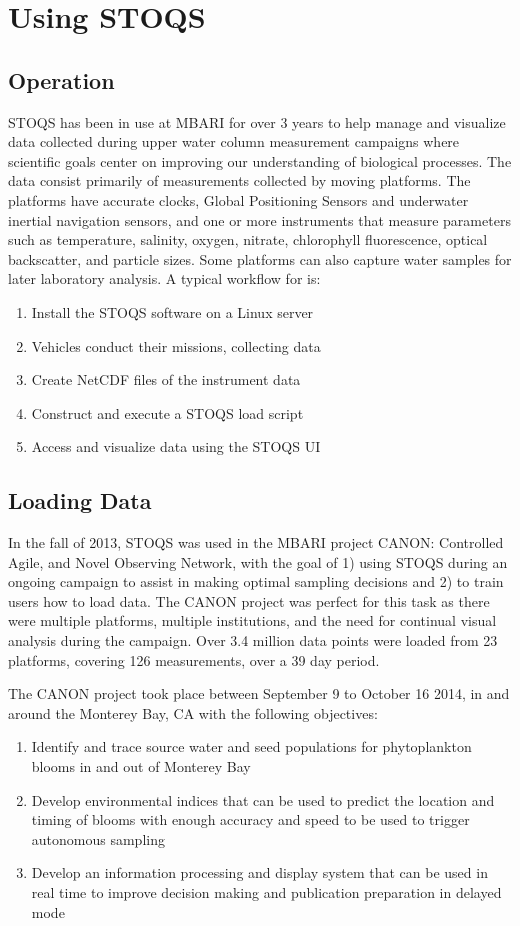 \section{Using STOQS}

\subsection{Operation}

STOQS has been in use at MBARI for over 3 years to help manage and visualize data collected during upper water column measurement campaigns where scientific goals center on improving our understanding of biological processes. The data consist primarily of measurements collected by moving platforms. The platforms have accurate clocks, Global Positioning Sensors and underwater inertial navigation sensors, and one or more instruments that measure parameters such as temperature, salinity, oxygen, nitrate, chlorophyll fluorescence, optical backscatter, and particle sizes. Some platforms can also capture water samples for later laboratory analysis. A typical workflow for is:
\begin{enumerate}
\item Install the STOQS software on a Linux server
\item Vehicles conduct their missions, collecting data
\item Create NetCDF files of the instrument data
\item Construct and execute a STOQS load script
\item Access and visualize data using the STOQS UI
\end{enumerate}


\subsection{Loading Data}

In the fall of 2013, STOQS was used in the MBARI project CANON: Controlled Agile, and Novel Observing Network, with the goal of 1) using STOQS during an ongoing campaign to assist in making optimal sampling decisions and 2) to train users how to load data.  The CANON project was perfect for this task as there were multiple platforms, multiple institutions, and the need for continual visual analysis during the campaign.  Over 3.4 million data points were loaded from 23 platforms, covering 126 measurements, over a 39 day period. 

The CANON project took place between September 9 to October 16 2014, in and around the Monterey Bay, CA with the following objectives: 
\begin{enumerate}
\item Identify and trace source water and seed populations for phytoplankton blooms in and out of Monterey Bay
\item Develop environmental indices that can be used to predict the location and timing of blooms with enough accuracy and speed to be used to trigger autonomous sampling
\item Develop an information processing and display system that can be used in real time to improve decision making and publication preparation in delayed mode
\end{enumerate}

